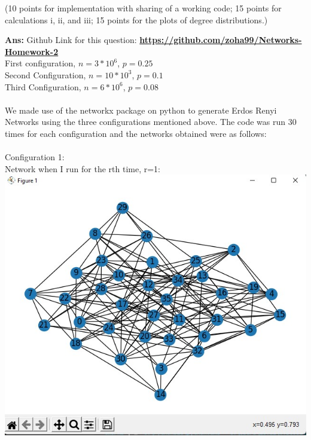 \documentclass[answers]{exam}
\begin{document}
\begin{questions}
(10 points for implementation with sharing of a working code; 15 points for calculations i, ii, and iii; 15 points for the plots of degree distributions.)

\begin{framed}

\textbf{Ans:} Github Link for this question:   \textbf{\url{https://github.com/zoha99/Networks-Homework-2}}\\
First configuration, $n=3*10^6$, $p=0.25$\\Second Configuration, $n=10*10^3$, $p=0.1$ \\Third Configuration, $n=6*10^6$, $p=0.08$\\\\We made use of the networkx package on python to generate Erdos Renyi Networks using the three configurations mentioned above. The code was run 30 times for each configuration and the networks obtained were as follows:
\\\\
Configuration 1:\\Network when I run for the rth time, r=1:\\
\includegraphics[width=10 cm]{first conf 1.jpg}\\


\end{framed}
\end{questions}
\end{document}
